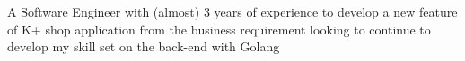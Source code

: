 


\begin{cvparagraph}


    A Software Engineer with (almost) 3 years of experience to develop a new feature of K+ shop application from the business requirement looking to continue to develop my skill set on the back-end with Golang

\end{cvparagraph}
